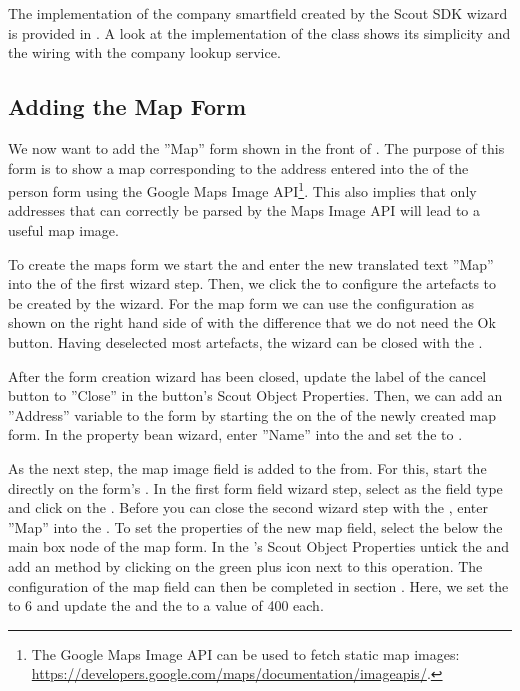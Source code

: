\documentclass[a4paper,10pt,twoside]{book}
\begin{document}
The implementation of the company smartfield created by the Scout SDK wizard is provided in . 
A look at the implementation of the  class shows its simplicity and the wiring with the company lookup service.

\subsection{Adding the Map Form}

We now want to add the ''Map'' form shown in the front of .
The purpose of this form is to show a map corresponding to the address entered into the  of the person form using the Google Maps Image API\footnote{
The Google Maps Image API can be used to fetch static map images: \url{https://developers.google.com/maps/documentation/imageapis/}.
}.
This also implies that only addresses that can correctly be parsed by the Maps Image API will lead to a useful map image.

To create the maps form we start the  and enter the new translated text ''Map'' into the  of the first wizard step. 
Then, we click the  to configure the artefacts to be created by the wizard. 
For the map form we can use the configuration as shown on the right hand side of  with the difference that we do not need the Ok button.
Having deselected most artefacts, the wizard can be closed with the .

After the form creation wizard has been closed, update the label of the cancel button to ''Close'' in the button's Scout Object Properties. 
Then, we can add an ''Address'' variable to the form by starting the  on the  of the newly created map form.
In the property bean wizard, enter ''Name'' into the  and set the  to . 

As the next step, the map image field is added to the from. 
For this, start the  directly on the form's . 
In the first form field wizard step, select  as the field type and click on the . 
Before you can close the second wizard step with the , enter ''Map'' into the . 
To set the properties of the new map field, select the  below the main box node of the map form. 
In the 's Scout Object Properties untick the  and add an  method by clicking on the green plus icon next to this operation. 
The configuration of the map field can then be completed in section . 
Here, we set the  to 6 and update the  and the  to a value of 400 each. 
\end{document}
